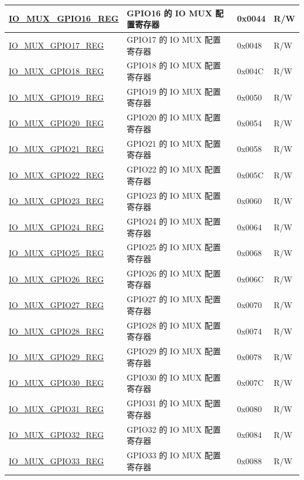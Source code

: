 \begin{longtable}{ | p{6cm} | p{7.2cm} | p{1.3cm} | p{1cm} | }
\hyperref[regdesc:IOMUXGPIONREG]{IO\_MUX\_GPIO16\_REG} & GPIO16 的 IO MUX 配置寄存器 & 0x0044 & R/W \\ \hline
\hyperref[regdesc:IOMUXGPIONREG]{IO\_MUX\_GPIO17\_REG} & GPIO17 的 IO MUX 配置寄存器 & 0x0048 & R/W \\ \hline
\hyperref[regdesc:IOMUXGPIONREG]{IO\_MUX\_GPIO18\_REG} & GPIO18 的 IO MUX 配置寄存器 & 0x004C & R/W \\ \hline
\hyperref[regdesc:IOMUXGPIONREG]{IO\_MUX\_GPIO19\_REG} & GPIO19 的 IO MUX 配置寄存器 & 0x0050 & R/W \\ \hline
\hyperref[regdesc:IOMUXGPIONREG]{IO\_MUX\_GPIO20\_REG} & GPIO20 的 IO MUX 配置寄存器 & 0x0054 & R/W \\ \hline
\hyperref[regdesc:IOMUXGPIONREG]{IO\_MUX\_GPIO21\_REG} & GPIO21 的 IO MUX 配置寄存器 & 0x0058 & R/W \\ \hline
\hyperref[regdesc:IOMUXGPIONREG]{IO\_MUX\_GPIO22\_REG} & GPIO22 的 IO MUX 配置寄存器 & 0x005C & R/W \\ \hline
\hyperref[regdesc:IOMUXGPIONREG]{IO\_MUX\_GPIO23\_REG} & GPIO23 的 IO MUX 配置寄存器 & 0x0060 & R/W \\ \hline
\hyperref[regdesc:IOMUXGPIONREG]{IO\_MUX\_GPIO24\_REG} & GPIO24 的 IO MUX 配置寄存器 & 0x0064 & R/W \\ \hline
\hyperref[regdesc:IOMUXGPIONREG]{IO\_MUX\_GPIO25\_REG} & GPIO25 的 IO MUX 配置寄存器 & 0x0068 & R/W \\ \hline
\hyperref[regdesc:IOMUXGPIONREG]{IO\_MUX\_GPIO26\_REG} & GPIO26 的 IO MUX 配置寄存器 & 0x006C & R/W \\ \hline
\hyperref[regdesc:IOMUXGPIONREG]{IO\_MUX\_GPIO27\_REG} & GPIO27 的 IO MUX 配置寄存器 & 0x0070 & R/W \\ \hline
\hyperref[regdesc:IOMUXGPIONREG]{IO\_MUX\_GPIO28\_REG} & GPIO28 的 IO MUX 配置寄存器 & 0x0074 & R/W \\ \hline
\hyperref[regdesc:IOMUXGPIONREG]{IO\_MUX\_GPIO29\_REG} & GPIO29 的 IO MUX 配置寄存器 & 0x0078 & R/W \\ \hline
\hyperref[regdesc:IOMUXGPIONREG]{IO\_MUX\_GPIO30\_REG} & GPIO30 的 IO MUX 配置寄存器 & 0x007C & R/W \\ \hline
\hyperref[regdesc:IOMUXGPIONREG]{IO\_MUX\_GPIO31\_REG} & GPIO31 的 IO MUX 配置寄存器 & 0x0080 & R/W \\ \hline
\hyperref[regdesc:IOMUXGPIONREG]{IO\_MUX\_GPIO32\_REG} & GPIO32 的 IO MUX 配置寄存器 & 0x0084 & R/W \\ \hline
\hyperref[regdesc:IOMUXGPIONREG]{IO\_MUX\_GPIO33\_REG} & GPIO33 的 IO MUX 配置寄存器 & 0x0088 & R/W \\ \hline

\end{longtable}
